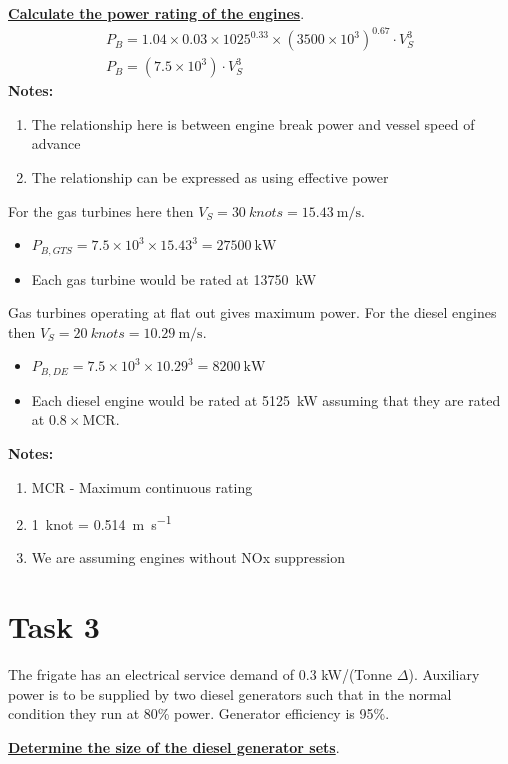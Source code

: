 \textbf{\underline{Calculate the power rating of the engines}}.
\begin{gather}
    P_B = 1.04 \times 0.03 \times 1025^{0.33}\times \left(3500\times 10^3\right)^{0.67}\cdot V_S^3\\
    P_B = \left(7.5\times 10^3\right)\cdot V_S^3
\end{gather}
\textbf{Notes:}
\begin{enumerate}
    \item The relationship here is between engine break power and vessel speed of advance
    \item The relationship can be expressed as using effective power
\end{enumerate}
For the gas turbines here then $V_S = \SI{30}{knots} = \SI{15.43}{\meter\per\second}$.
\begin{itemize}
    \item $P_{B,GTS} = 7.5\times 10^3\times 15.43^3 = \SI{27500}{\kilo\watt}$
    \item Each gas turbine would be rated at \SI{13750}{\kilo\watt}
\end{itemize}
Gas turbines operating at flat out gives maximum power. For the diesel engines then $V_S = \SI{20}{knots} = \SI{10.29}{\meter\per\second}$.
\begin{itemize}
    \item $P_{B,DE} = 7.5\times 10^3 \times 10.29^3 = \SI{8200}{\kilo\watt}$
    \item Each diesel engine would be rated at \SI{5125}{\kilo\watt} assuming that they are rated at $0.8\times \textrm{MCR}$.
\end{itemize}
\textbf{Notes:}
\begin{enumerate}
    \item MCR - Maximum continuous rating
    \item \SI{1}{knot} = \SI{0.514}{\meter\per\second}
    \item We are assuming engines without NOx suppression
\end{enumerate}
\section{Task 3}
The frigate has an electrical service demand of 0.3 kW/(Tonne $\Delta$). Auxiliary power is to be supplied by two diesel generators such that in the normal condition they run at 80\% power. Generator efficiency is 95\%.

\textbf{\underline{Determine the size of the diesel generator sets}}.

